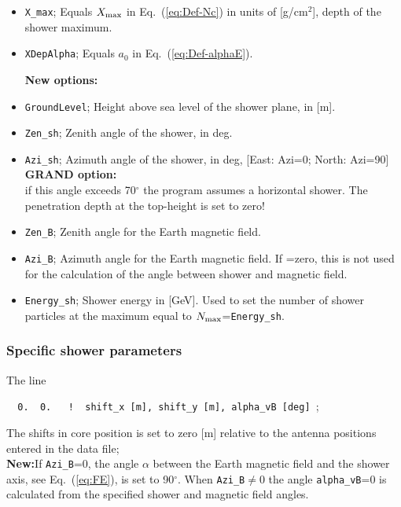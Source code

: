 \documentclass[pdftex,dvipsnames,usenames,fleqn,12pt]{article}
\def\eqref#1{Eq.~(\ref{eq:#1})}
\newcommand{\RED}{\color[named]{Red}}
\newcommand{\Added}[2]{{\marginpar{\RED \bf #1}\RED\bf #2}}
\begin{document}
\begin{itemize}
\item{\verb<X_max<}; Equals $X_{\rm max}$ in \eqref{Def-Nc} in units of [g/cm$^2$], depth of the shower maximum.

\item{\verb<XDepAlpha<}; Equals $a_0$ in \eqref{Def-alphaE}.

\Added{11/02/'18}{New options:}
\item{\verb<GroundLevel<}; Height above sea level of the shower plane, in [m].
\item{\verb<Zen_sh<}; Zenith angle of the shower, in deg.
\item{\verb<Azi_sh<}; Azimuth angle of the shower, in deg, [East: Azi=0; North: Azi=90]
\\ \Added{15/07/'18}{GRAND option:}
\\if this angle exceeds 70$^\circ$ the program assumes a horizontal shower. The penetration depth at the top-height is set to zero!
\item{\verb<Zen_B<}; Zenith angle for the Earth magnetic field.
\item{\verb<Azi_B<}; Azimuth angle for the Earth magnetic field. If =zero, this is not used for the calculation of the angle between shower and magnetic field.
\item{\verb<Energy_sh<}; Shower energy in [GeV]. Used to set the number of shower particles at the maximum equal to $N_{\rm max}$=\verb<Energy_sh<.
\end{itemize}

\subsubsection{Specific shower parameters}

The line

\begin{linenumbers}\resetlinenumber[12]
\noindent\verb<  0.  0.   !  shift_x [m], shift_y [m], alpha_vB [deg] <;
\end{linenumbers}
The shifts in core position is set to zero [m] relative to the antenna positions entered in the data file;
\\\Added{11/02/'18}{New:}If \verb<Azi_B<=0, the angle $\alpha$ between the Earth magnetic field and the shower axis, see \eqref{FE}, is set to 90$^\circ$. When \verb<Azi_B<$\ne$0 the angle \verb<alpha_vB<=0 is calculated from the specified shower and magnetic field angles.
\end{document}
